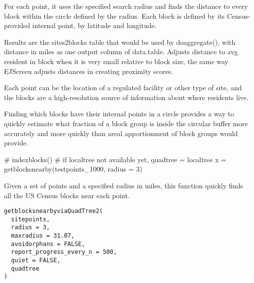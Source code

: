 \documentclass[a4paper]{book}
\begin{document}
%
\begin{Details}\relax
For each point, it uses the specified search radius and finds the distance to
every block within the circle defined by the radius.
Each block is defined by its Census-provided internal point, by latitude and longitude.

Results are the sites2blocks table that would be used by doaggregate(),
with distance in miles as one output column of data.table.
Adjusts distance to avg resident in block when it is very small relative to block size,
the same way EJScreen adjusts distances in creating proximity scores.

Each point can be the location of a regulated facility or other type of site, and
the blocks are a high-resolution source of information about where
residents live.

Finding which blocks have their internal points in a circle provides
a way to quickly estimate what fraction of a block group is
inside the circular buffer more accurately and more quickly than
areal apportionment of block groups would provide.
\end{Details}
%
\begin{SeeAlso}\relax
{} 
\end{SeeAlso}
%
\begin{Examples}
\begin{ExampleCode}
  # indexblocks() # if localtree not available yet, quadtree = localtree
  x = getblocksnearby(testpoints_1000, radius = 3)
\end{ExampleCode}
\end{Examples}
%
\begin{Description}\relax
Given a set of points and a specified radius in miles,
this function quickly finds all the US Census blocks near each point.
\end{Description}
%
\begin{Usage}
\begin{verbatim}
getblocksnearbyviaQuadTree2(
  sitepoints,
  radius = 3,
  maxradius = 31.07,
  avoidorphans = FALSE,
  report_progress_every_n = 500,
  quiet = FALSE,
  quadtree
)
\end{verbatim}
\end{Usage}
%
\end{document}
